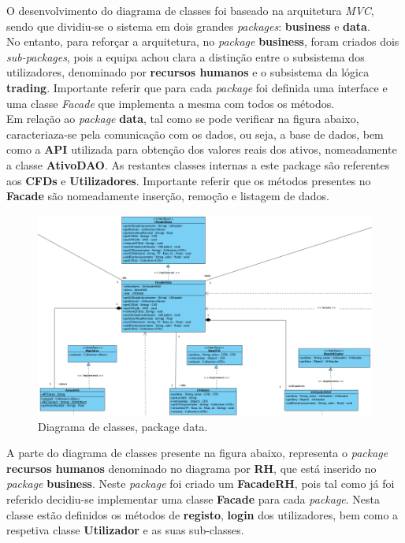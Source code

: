 \documentclass[11pt,a4paper]{report}%
\begin{document}
O desenvolvimento do diagrama de classes foi baseado na arquitetura \emph{MVC}, sendo que dividiu-se o sistema em dois grandes \emph{packages}: \textbf{business} e \textbf{data}. \\No entanto, para reforçar a arquitetura, no \emph{package} \textbf{business}, foram criados dois  \emph{sub-packages}, pois a equipa achou clara a distinção entre o subsistema dos utilizadores, denominado por \textbf{recursos humanos} e o subsistema da lógica \textbf{trading}. Importante referir que para cada \emph{package} foi definida uma interface e uma classe \emph{Facade} que implementa a mesma com todos os métodos.\\
\newline
Em relação ao \emph{package} \textbf{data}, tal como se pode verificar na figura abaixo, caracteriaza-se pela comunicação com os dados, ou seja, a base de dados, bem como a \textbf{API} utilizada para obtenção dos valores reais dos ativos, nomeadamente a classe \textbf{AtivoDAO}. As restantes classes internas a este package são referentes aos \textbf{CFDs} e \textbf{Utilizadores}. Importante referir que os métodos presentes no \textbf{Facade} são nomeadamente inserção, remoção e listagem de dados.

\begin{figure}[H]
	\centering
	\includegraphics[scale=0.5]{diagrama-classes-1.png}
	\caption{Diagrama de classes, package data. }
	\label{img:pag}
\end{figure}

\newpage

A parte do diagrama de classes presente na figura abaixo, representa o \emph{package} \textbf{recursos humanos} denominado no diagrama por \textbf{RH}, que está inserido no \emph{package} \textbf{business}. Neste \emph{package} foi criado um \textbf{FacadeRH}, pois tal como já foi referido decidiu-se implementar uma classe \textbf{Facade} para cada \emph{package}. Nesta classe estão definidos os métodos de \textbf{registo}, \textbf{login} dos utilizadores, bem como a respetiva classe \textbf{Utilizador} e as suas sub-classes.
\end{document}
